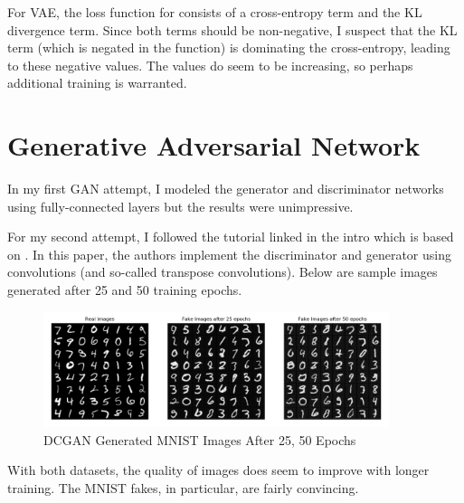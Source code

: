 \documentclass[letterpaper, 10pt]{article}
\begin{document}
\newpage


For VAE, the loss function for consists of a cross-entropy term and the KL divergence term.
Since both terms should be non-negative, I suspect that the KL term
(which is negated in the function) is dominating the cross-entropy, leading to
these negative values. The values do seem to be increasing, so perhaps
additional training is warranted.

\newpage

\section{Generative Adversarial Network\cite{goodfellow2014generative}}

In my first GAN attempt, I modeled the generator and discriminator networks using fully-connected layers but the results were unimpressive.

For my second attempt, I followed the tutorial linked in the intro which is based on \cite{radford2015unsupervised}. In this paper, the authors implement the discriminator and generator using convolutions (and so-called transpose convolutions).
Below are sample images generated after 25 and 50 training epochs.

\begin{figure}[h]
 \caption{DCGAN Generated MNIST Images After 25, 50 Epochs}
 \centering
 \includegraphics[width=0.9\textwidth]{mnist_gan_real_v_fake_50_epochs}
\end{figure}

With both datasets, the quality of images does seem to improve with longer training.
The MNIST fakes, in particular, are fairly convincing.
\end{document}
